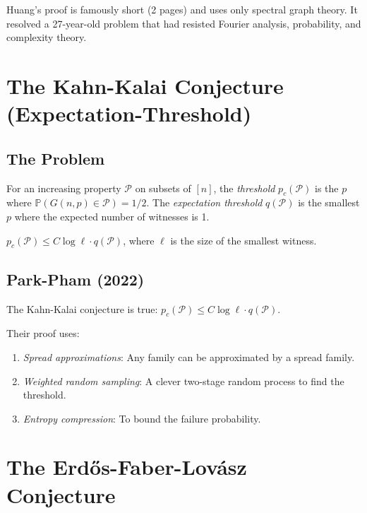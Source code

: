 \begin{highlightbox}
Huang's proof is famously short (2 pages) and uses only spectral graph theory. It resolved a 27-year-old problem that had resisted Fourier analysis, probability, and complexity theory.
\end{highlightbox}

\section{The Kahn-Kalai Conjecture (Expectation-Threshold)}

\subsection{The Problem}
For an increasing property $\mathcal{P}$ on subsets of $[n]$, the \emph{threshold} $p_c(\mathcal{P})$ is the $p$ where $\mathbb{P}(G(n,p) \in \mathcal{P}) = 1/2$. The \emph{expectation threshold} $q(\mathcal{P})$ is the smallest $p$ where the expected number of witnesses is 1.

\begin{conjecture}
$p_c(\mathcal{P}) \le C \log \ell \cdot q(\mathcal{P})$, where $\ell$ is the size of the smallest witness.
\end{conjecture}

\subsection{Park-Pham (2022)}

\begin{theorem}
The Kahn-Kalai conjecture is true: $p_c(\mathcal{P}) \le C \log \ell \cdot q(\mathcal{P})$.
\end{theorem}

Their proof uses:
\begin{enumerate}
\item \emph{Spread approximations}: Any family can be approximated by a spread family.
\item \emph{Weighted random sampling}: A clever two-stage random process to find the threshold.
\item \emph{Entropy compression}: To bound the failure probability.
\end{enumerate}

\section{The Erdős-Faber-Lovász Conjecture}

